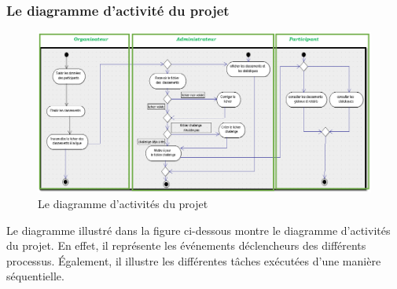 \subsubsection{Le diagramme d'activité du projet}
\begin{figure}
	   \center
	   \includegraphics[scale=0.9]{img/Diagramme_activites.png}
	   \caption {Le diagramme d’activités du projet}
\end{figure}

Le diagramme illustré dans la figure ci-dessous montre le diagramme d’activités du projet. En effet, il représente les événements déclencheurs des différents processus. Également, il illustre les différentes tâches exécutées d’une manière séquentielle. 